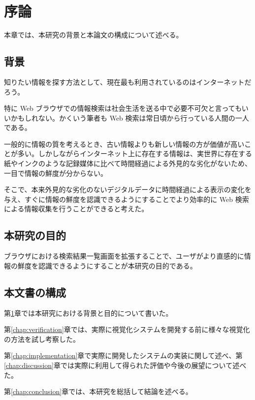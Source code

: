 \chapter{序論}
\label{chap:introduction}

本章では、本研究の背景と本論文の構成について述べる。

\newpage

\section{背景}

知りたい情報を探す方法として、現在最も利用されているのはインターネットだろう。

特に Web ブラウザでの情報検索は社会生活を送る中で必要不可欠と言ってもいいかもしれない。かくいう筆者も Web 検索は常日頃から行っている人間の一人である。

一般的に情報の質を考えるとき、古い情報よりも新しい情報の方が価値が高いことが多い。しかしながらインターネット上に存在する情報は、実世界に存在する紙やインクのような記録媒体に比べて時間経過による外見的な劣化がないため、一目で情報の鮮度が分からない。

そこで、本来外見的な劣化のないデジタルデータに時間経過による表示の変化を与え、すぐに情報の鮮度を認識できるようにすることでより効率的に Web 検索による情報収集を行うことができると考えた。

\section{本研究の目的}

ブラウザにおける検索結果一覧画面を拡張することで、ユーザがより直感的に情報の鮮度を認識できるようにすることが本研究の目的である。

\section{本文書の構成}

第\ref{chap:introduction}章では本研究における背景と目的について書いた。

第\ref{chap:verification}章では、実際に視覚化システムを開発する前に様々な視覚化の方法を試し考察した。

第\ref{chap:implementation}章で実際に開発したシステムの実装に関して述べ、第\ref{chap:discussion}章では実際に利用して得られた評価や今後の展望について述べた。

第\ref{chap:conclusion}章では、本研究を総括して結論を述べる。
